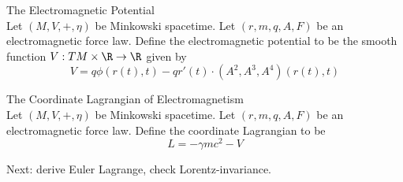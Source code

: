 \documentclass[a4paper]{article}
\begin{document}
\begin{defn}{The Electromagnetic Potential}{}\\
Let $(M,V,+,\eta)$ be Minkowski spacetime. Let $(r,m,q,A,F)$ be an electromagnetic force law. Define the electromagnetic potential to be the smooth function $V:TM\times\R\to\R$ given by $$V=q\phi(r(t),t)-qr'(t)\cdot(A^2,A^3,A^4)(r(t),t)$$
\end{defn}

\begin{defn}{The Coordinate Lagrangian of Electromagnetism}{}\\
Let $(M,V,+,\eta)$ be Minkowski spacetime. Let $(r,m,q,A,F)$ be an electromagnetic force law. Define the coordinate Lagrangian to be $$L=-\gamma mc^2-V$$
\end{defn}

Next: derive Euler Lagrange, check Lorentz-invariance. 
\end{document}
